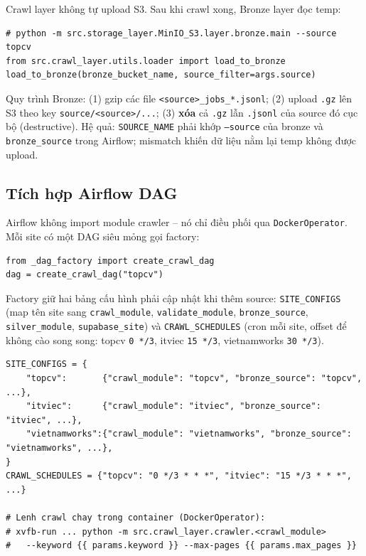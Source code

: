 Crawl layer không tự upload S3. Sau khi crawl xong, Bronze layer đọc temp:

\begin{lstlisting}[caption={Bronze upload (src/storage\_layer/MinIO\_S3/layer/bronze/main.py)},label={lst:bronze}]
# python -m src.storage_layer.MinIO_S3.layer.bronze.main --source topcv
from src.crawl_layer.utils.loader import load_to_bronze
load_to_bronze(bronze_bucket_name, source_filter=args.source)
\end{lstlisting}

Quy trình Bronze: (1) gzip các file \texttt{<source>\_jobs\_*.jsonl}; (2) upload
\texttt{.gz} lên S3 theo key \texttt{source/<source>/...}; (3) \textbf{xóa} cả
\texttt{.gz} lẫn \texttt{.jsonl} của source đó cục bộ (destructive). Hệ quả:
\texttt{SOURCE\_NAME} phải khớp \texttt{--source} của bronze và
\texttt{bronze\_source} trong Airflow; mismatch khiến dữ liệu nằm lại temp không
được upload.


\subsection{Tích hợp Airflow DAG}
\label{subsec:crawl-airflow}

Airflow không import module crawler -- nó chỉ điều phối qua \texttt{DockerOperator}.
Mỗi site có một DAG siêu mỏng gọi factory:

\begin{lstlisting}[caption={DAG mỏng per-site (src/orchestration\_layer/dags/crawl\_topcv.py)},label={lst:dag-thin}]
from _dag_factory import create_crawl_dag
dag = create_crawl_dag("topcv")
\end{lstlisting}

Factory giữ hai bảng cấu hình phải cập nhật khi thêm source:
\texttt{SITE\_CONFIGS} (map tên site sang \texttt{crawl\_module},
\texttt{validate\_module}, \texttt{bronze\_source}, \texttt{silver\_module},
\texttt{supabase\_site}) và \texttt{CRAWL\_SCHEDULES} (cron mỗi site, offset để
không cào song song: topcv \texttt{0 */3}, itviec \texttt{15 */3}, vietnamworks
\texttt{30 */3}).

\begin{lstlisting}[caption={Cấu hình site và lệnh crawl trong DAG factory},label={lst:dag-factory}]
SITE_CONFIGS = {
    "topcv":       {"crawl_module": "topcv", "bronze_source": "topcv", ...},
    "itviec":      {"crawl_module": "itviec", "bronze_source": "itviec", ...},
    "vietnamworks":{"crawl_module": "vietnamworks", "bronze_source": "vietnamworks", ...},
}
CRAWL_SCHEDULES = {"topcv": "0 */3 * * *", "itviec": "15 */3 * * *", ...}

# Lenh crawl chay trong container (DockerOperator):
# xvfb-run ... python -m src.crawl_layer.crawler.<crawl_module>
#   --keyword {{ params.keyword }} --max-pages {{ params.max_pages }}
\end{lstlisting}

